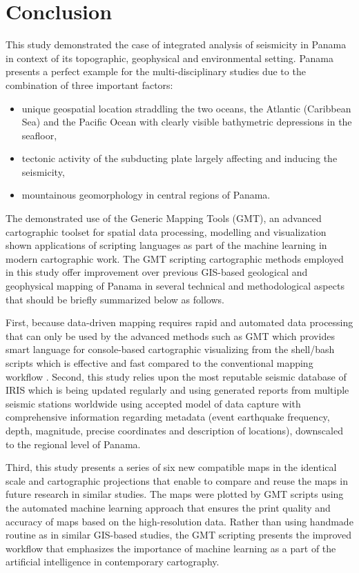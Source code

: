 \documentclass[10pt,twoside,twocolumn,a4paper]{article}
\begin{document}
\section{Conclusion}
This study demonstrated the case of integrated analysis of seismicity in Panama in context of its topographic, geophysical and environmental setting. Panama presents a perfect example for the multi-disciplinary studies due to the combination of three important factors: 
\begin{itemize}
	\item unique geospatial location straddling the two oceans, the Atlantic (Caribbean Sea) and the Pacific Ocean with clearly visible bathymetric depressions in the seafloor, 
	\item tectonic activity of the subducting plate largely affecting and inducing the seismicity, 
	\item mountainous geomorphology in central regions of Panama.
\end{itemize}

The demonstrated use of the Generic Mapping Tools (GMT), an advanced cartographic toolset for spatial data processing, modelling and visualization shown applications of scripting languages as part of the machine learning in modern cartographic work. The GMT scripting cartographic methods employed in this study offer improvement over previous GIS-based geological and geophysical mapping of Panama in several technical and methodological aspects that should be briefly summarized below as follows.  

First, because data-driven mapping requires rapid and automated data processing that can only be used by the advanced methods such as GMT which provides smart language for console-based cartographic visualizing from the shell/bash scripts which is effective and fast compared to the conventional mapping workflow \cite{Ambraseys,Gonzalez,Wabnitz,Lemenkova2012j,Lemenkova2005b2,Lemenkova202125}.
Second, this study relies upon the most reputable seismic database of IRIS which is being updated regularly and using generated reports from multiple seismic stations worldwide using accepted model of data capture with comprehensive information regarding metadata (event earthquake frequency, depth, magnitude, precise coordinates and description of locations), downscaled to the regional level of Panama. 

Third, this study presents a series of six new compatible maps in the identical scale and cartographic projections that enable to compare and reuse the maps in future research in similar studies. The maps were plotted by GMT scripts using the automated machine learning approach that ensures the print quality and accuracy of maps based on the high-resolution data. Rather than using handmade routine as in similar GIS-based studies, the GMT scripting presents the improved workflow that emphasizes the importance of machine learning as a part of the artificial intelligence in contemporary cartography.
\end{document}
